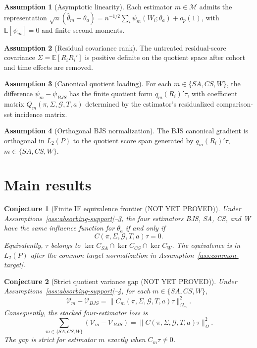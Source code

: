 \documentclass[11pt]{article}
\newcommand{\E}{\mathbb{E}}
\theoremstyle{definition}
\newtheorem{assumption}{Assumption}
\theoremstyle{plain}
\newtheorem{conjecture}{Conjecture}
\theoremstyle{remark}
\begin{document}
\begin{assumption}[Asymptotic linearity]\label{ass:asym-linear}
Each estimator \(m\in\mathcal M\) admits the representation \(\sqrt n(\hat\theta_m-\theta_a)=n^{-1/2}\sum_i\psi_m(W_i;\theta_a)+o_p(1)\), with \(\E[\psi_m]=0\) and finite second moments.
\end{assumption}

\begin{assumption}[Residual covariance rank]\label{ass:cov-rank}
The untreated residual-score covariance \(\Sigma=\E[R_iR_i']\) is positive definite on the quotient space after cohort and time effects are removed.
\end{assumption}

\begin{assumption}[Canonical quotient loading]\label{ass:quotient-loading}
For each \(m\in\{SA,CS,W\}\), the difference \(\psi_m-\psi_{BJS}\) has the finite quotient form \(q_m(R_i)'\tau\), with coefficient matrix \(Q_m(\pi,\Sigma,\mathcal G,T,a)\) determined by the estimator's residualized comparison-set incidence matrix.
\end{assumption}

\begin{assumption}[Orthogonal BJS normalization]\label{ass:bjs-orthogonal}
The BJS canonical gradient is orthogonal in \(L_2(P)\) to the quotient score span generated by \(q_m(R_i)'\tau\), \(m\in\{SA,CS,W\}\).
\end{assumption}

\section{Main results}
\begin{conjecture}[Finite IF equivalence frontier (NOT YET PROVED)]\label{conj:frontier}
Under Assumptions~\ref{ass:absorbing-support}--\ref{ass:quotient-loading}, the four estimators BJS, SA, CS, and W have the same influence function for \(\theta_a\) if and only if
\[
  C(\pi,\Sigma,\mathcal G,T,a)\tau=0.
\]
Equivalently, \(\tau\) belongs to \(\ker C_{SA}\cap\ker C_{CS}\cap\ker C_W\). The equivalence is in \(L_2(P)\) after the common target normalization in Assumption~\ref{ass:common-target}.
\end{conjecture}

\begin{conjecture}[Strict quotient variance gap (NOT YET PROVED)]\label{conj:variance-gap}
Under Assumptions~\ref{ass:absorbing-support}--\ref{ass:bjs-orthogonal}, for each \(m\in\{SA,CS,W\}\),
\[
  \mathcal V_m-\mathcal V_{BJS}=\|C_m(\pi,\Sigma,\mathcal G,T,a)\tau\|^2_{\Omega_m}.
\]
Consequently, the stacked four-estimator loss is
\[
  \sum_{m\in\{SA,CS,W\}}(\mathcal V_m-\mathcal V_{BJS})=\|C(\pi,\Sigma,\mathcal G,T,a)\tau\|^2_{\Omega}.
\]
The gap is strict for estimator \(m\) exactly when \(C_m\tau\ne0\).
\end{conjecture}
\end{document}
